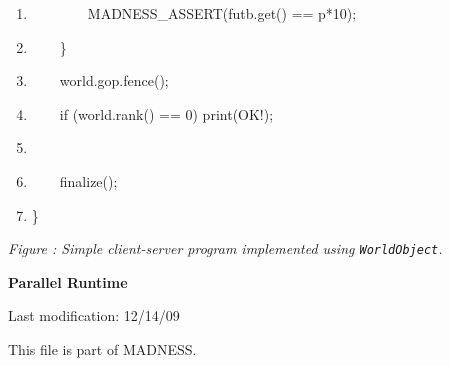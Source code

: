 \documentclass[letterpaper]{article}
\newcounter{Figure}
\renewcommand\theFigure{\arabic{Figure}}
\begin{document}
\begin{center}
\begin{minipage}{}
\begin{enumerate}
\item {\ttfamily
\ \ \ \ \ \ \ \ MADNESS\_ASSERT(futb.get() == p*10);}
\item {\ttfamily
\ \ \ \ \}}
\item {\ttfamily
\ \ \ \ world.gop.fence();}
\item {\ttfamily
\ \ \ \ if (world.rank() == 0) print({\textquotedbl}OK!{\textquotedbl});}
\item 
\bigskip
\item {\ttfamily
\ \ \ \ finalize();}
\item {\ttfamily
\}}
\end{enumerate}
{\centering\itshape
Figure {\theFigure\label{seq:refFigure1}}: Simple client-server program implemented using
\texttt{WorldObject}.
\par}
\end{minipage}
\end{center}
{\centering\bfseries
Parallel Runtime
\par}


\bigskip


\bigskip


\bigskip


\bigskip


\bigskip


\bigskip


\bigskip


\bigskip


\bigskip


\bigskip


\bigskip


\bigskip

{\centering
Last modification: 12/14/09
\par}


\bigskip


\bigskip


\bigskip


\bigskip


\bigskip


\bigskip


\bigskip


\bigskip


\bigskip


\bigskip


\bigskip


\bigskip


\bigskip


\bigskip


\bigskip

This file is part of MADNESS.
\end{document}
